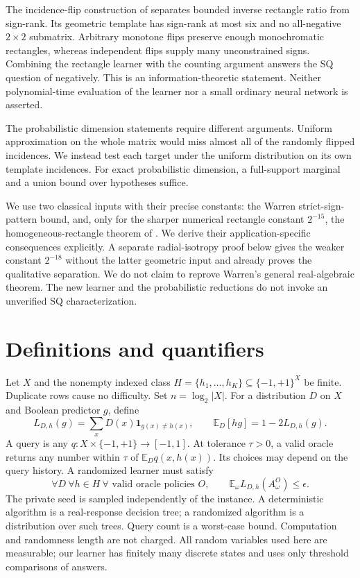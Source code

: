 \documentclass[11pt]{article}
\newcommand{\E}{\mathbb E}
\newcommand{\1}{\mathbf 1}
\begin{document}
The incidence-flip construction of \citet{HHPTZ22} separates bounded inverse rectangle ratio from sign-rank. Its geometric template has sign-rank at most six and no all-negative $2\times2$ submatrix. Arbitrary monotone flips preserve enough monochromatic rectangles, whereas independent flips supply many unconstrained signs. Combining the rectangle learner with the counting argument answers the SQ question of \citet{FKS26} negatively. This is an information-theoretic statement. Neither polynomial-time evaluation of the learner nor a small ordinary neural network is asserted.

The probabilistic dimension statements require different arguments. Uniform approximation on the whole matrix would miss almost all of the randomly flipped incidences. We instead test each target under the uniform distribution on its own template incidences. For exact probabilistic dimension, a full-support marginal and a union bound over hypotheses suffice.

We use two classical inputs with their precise constants: the Warren strict-sign-pattern bound, and, only for the sharper numerical rectangle constant $2^{-15}$, the homogeneous-rectangle theorem of \citet{APP05}. We derive their application-specific consequences explicitly. A separate radial-isotropy proof below gives the weaker constant $2^{-18}$ without the latter geometric input and already proves the qualitative separation. We do not claim to reprove Warren's general real-algebraic theorem. The new learner and the probabilistic reductions do not invoke an unverified SQ characterization.

\section{Definitions and quantifiers}
Let $X$ and the nonempty indexed class $H=\{h_1,\ldots,h_K\}\subseteq\{-1,+1\}^X$ be finite. Duplicate rows cause no difficulty. Set $n=\log_2|X|$. For a distribution $D$ on $X$ and Boolean predictor $g$, define
\[
 L_{D,h}(g)=\sum_xD(x)\1_{g(x)\ne h(x)},\qquad
 \E_D[hg]=1-2L_{D,h}(g).
\]
A query is any $q:X\times\{-1,+1\}\to[-1,1]$. At tolerance $\tau>0$, a valid oracle returns any number within $\tau$ of $\E_D q(x,h(x))$. Its choices may depend on the query history. A randomized learner must satisfy
\begin{equation}\label{eq:guarantee}
 \forall D\ \forall h\in H\ \forall\text{ valid oracle policies }O,
 \qquad \E_\omega L_{D,h}(A^O_\omega)\le\epsilon.
\end{equation}
The private seed is sampled independently of the instance. A deterministic algorithm is a real-response decision tree; a randomized algorithm is a distribution over such trees. Query count is a worst-case bound. Computation and randomness length are not charged. All random variables used here are measurable; our learner has finitely many discrete states and uses only threshold comparisons of answers.
\end{document}
